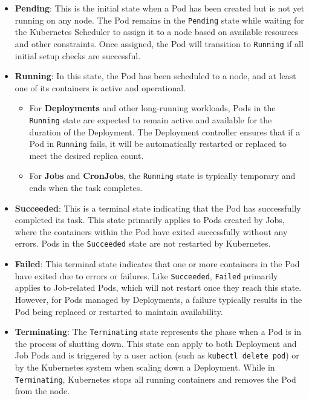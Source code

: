 \documentclass[main.tex]{subfiles}
\begin{document}
\begin{itemize}
\item \textbf{Pending}: This is the initial state when a Pod has been created but is not yet running on any node. The Pod remains in the \texttt{Pending} state while waiting for the Kubernetes Scheduler to assign it to a node based on available resources and other constraints. Once assigned, the Pod will transition to \texttt{Running} if all initial setup checks are successful.

\item \textbf{Running}: In this state, the Pod has been scheduled to a node, and at least one of its containers is active and operational. 
\begin{itemize}
    \item For \textbf{Deployments} and other long-running workloads, Pods in the \texttt{Running} state are expected to remain active and available for the duration of the Deployment. The Deployment controller ensures that if a Pod in \texttt{Running} fails, it will be automatically restarted or replaced to meet the desired replica count.
    \item For \textbf{Jobs} and \textbf{CronJobs}, the \texttt{Running} state is typically temporary and ends when the task completes. 
\end{itemize}

\item \textbf{Succeeded}: This is a terminal state indicating that the Pod has successfully completed its task. This state primarily applies to Pods created by Jobs, where the containers within the Pod have exited successfully without any errors. Pods in the \texttt{Succeeded} state are not restarted by Kubernetes.

\item \textbf{Failed}: This terminal state indicates that one or more containers in the Pod have exited due to errors or failures. Like \texttt{Succeeded}, \texttt{Failed} primarily applies to Job-related Pods, which will not restart once they reach this state. However, for Pods managed by Deployments, a failure typically results in the Pod being replaced or restarted to maintain availability.

\item \textbf{Terminating}: The \texttt{Terminating} state represents the phase when a Pod is in the process of shutting down. This state can apply to both Deployment and Job Pods and is triggered by a user action (such as \texttt{kubectl delete pod}) or by the Kubernetes system when scaling down a Deployment. While in \texttt{Terminating}, Kubernetes stops all running containers and removes the Pod from the node.
\end{itemize}
\end{document}
